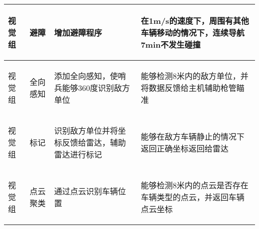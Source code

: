 \begin{longtable}{ p{1.5cm} | p{3cm} | p{6cm} | p{4.3cm} |}
    \hline

       \begin{center}
           视觉组
       \end{center} &
       \begin{center}
           避障
       \end{center} &
       \begin{center}
           增加避障程序
       \end{center} &
       \begin{center}
           在1m/s的速度下，周围有其他车辆移动的情况下，连续导航7min不发生碰撞
       \end{center} \\

    \hline

       \begin{center}
           视觉组
       \end{center} &
       \begin{center}
           全向感知
       \end{center} &
       \begin{center}
           添加全向感知，使哨兵能够360度识别敌方单位
       \end{center} &
       \begin{center}
           能够检测8米内的敌方单位，并将数据反馈给主机辅助枪管瞄准
       \end{center} \\

    \hline

       \begin{center}
           视觉组
       \end{center} &
       \begin{center}
           标记
       \end{center} &
       \begin{center}
           识别敌方单位并将坐标反馈给雷达，辅助雷达进行标记
       \end{center} &
       \begin{center}
           能够在敌方车辆静止的情况下返回正确坐标返回给雷达
       \end{center} \\

    \hline

       \begin{center}
           视觉组
       \end{center} &
       \begin{center}
           点云聚类
       \end{center} &
       \begin{center}
           通过点云识别车辆位置
       \end{center} &
       \begin{center}
           能够检测8米内的点云是否存在车辆类型的点云，并返回车辆点云坐标
       \end{center} \\
    
\end{longtable}
